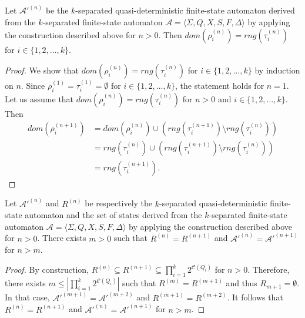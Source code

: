\begin{proposition}
  Let $\mathcal{A}'^{(n)}$ be the $k$-separated quasi-deterministic finite-state
  automaton derived from the $k$-separated finite-state automaton $\mathcal{A} =
  \langle \Sigma, Q, X, S, F, \Delta \rangle$ by applying the construction described
  above for $n > 0$. Then $dom(\rho_i^{(n)}) = rng(\tau_i^{(n)})$ for $i \in \{ 1, 2,
  \ldots, k \}$.
\end{proposition}

\begin{proof}
  We show that $dom(\rho_i^{(n)}) = rng(\tau_i^{(n)})$ for $i \in \{ 1, 2, \ldots, k
  \}$ by induction on $n$. Since $\rho_i^{(1)} = \tau_i^{(1)} = \emptyset$ for $i \in
  \{ 1, 2, \ldots, k \}$, the statement holds for $n = 1$. Let us assume that
  $dom(\rho_i^{(n)}) = rng(\tau_i^{(n)})$ for $n > 0$ and $i \in \{ 1, 2, \ldots, k
  \}$. Then
  \begin{align*}
    dom(\rho_i^{(n+1)}) & = dom(\rho_i^{(n)}) \cup (rng(\tau_i^{(n+1)}) \setminus
    rng(\tau_i^{(n)}))\\
                        & = rng(\tau_i^{(n)}) \cup (rng(\tau_i^{(n+1)}) \setminus
    rng(\tau_i^{(n)}))\\
                        & = rng(\tau_i^{(n+1)}).
  \end{align*}
\end{proof}

\begin{lemma}\label{lem:quasidet_completion}
  Let $\mathcal{A}'^{(n)}$ and $R^{(n)}$ be respectively the $k$-separated
  quasi-deterministic finite-state automaton and the set of states derived from the
  $k$-separated finite-state automaton $\mathcal{A} = \langle \Sigma, Q, X, S, F,
  \Delta \rangle$ by applying the construction described above for $n > 0$. There
  exists $m > 0$ such that $R^{(n)} = R^{(n+1)}$ and $\mathcal{A}'^{(n)} =
  \mathcal{A}'^{(n+1)}$ for $n > m$.
\end{lemma}

\begin{proof}
  By construction, $R^{(n)} \subseteq R^{(n+1)} \subseteq
  \prod_{i=1}^k{2^{\mathcal{C}(Q_i)}}$ for $n > 0$. Therefore, there exists $m \leq
  |\prod_{i=1}^k{2^{\mathcal{C}(Q_i)}}|$ such that $R^{(m)} = R^{(m+1)}$ and thus
  $R_{m+1} = \emptyset$. In that case, $\mathcal{A}'^{(m+1)} = \mathcal{A}'^{(m+2)}$
  and $R^{(m+1)} = R^{(m+2)}$. It follows that $R^{(n)} = R^{(n+1)}$ and
  $\mathcal{A}'^{(n)} = \mathcal{A}'^{(n+1)}$ for $n > m$.
\end{proof}

